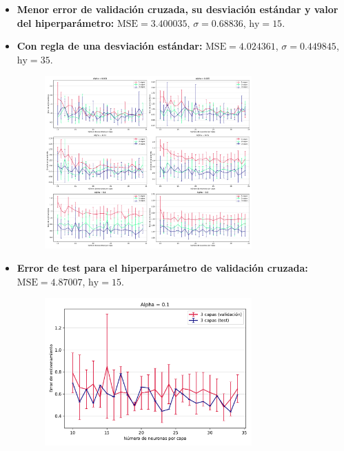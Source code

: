 \documentclass[11pt]{article}
\begin{document}
\begin{itemize}
    \item \textbf{Menor error de validación cruzada, su desviación estándar y valor del hiperparámetro:} $\text{MSE} = 3.400035$, $\sigma = 0.68836$, $\text{hy} = 15$.
    \item \textbf{Con regla de una desviación estándar:} $\text{MSE} = 4.024361$, $\sigma = 0.449845$, $\text{hy} = 35$.
    \begin{figure}[H]
    \centering
    \includegraphics[width=0.75\textwidth]{fotos/ej3_1.pdf}
    \end{figure}
    \item \textbf{Error de test para el hiperparámetro de validación cruzada:} $\text{MSE} = 4.87007$, $\text{hy} = 15$.
    \begin{figure}[H]
    \centering
    \includegraphics[width=0.75\textwidth]{fotos/ej3_2.pdf}
    \end{figure}
\end{itemize}
\end{document}
